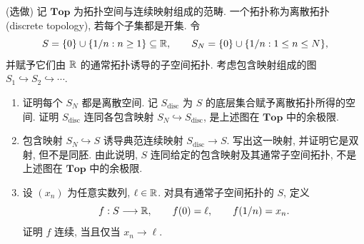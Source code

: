 \documentclass{article}
\begin{document}
\begin{problem}
({\heiti 选做}) 记 $\mathbf{Top}$ 为拓扑空间与连续映射组成的范畴. 一个拓扑称为离散拓扑 (discrete topology), 若每个子集都是开集. 令
\[
  S=\{0\}\cup\{1/n:n\ge1\}\subseteq\mathbb{R},\qquad S_N=\{0\}\cup\{1/n:1\le n\le N\},
\]
并赋予它们由 $\mathbb{R}$ 的通常拓扑诱导的子空间拓扑. 考虑包含映射组成的图 $S_1\hookrightarrow S_2\hookrightarrow\cdots$.
\begin{enumerate}
  \item[(a)] 证明每个 $S_N$ 都是离散空间. 记 $S_{\mathrm{disc}}$ 为 $S$ 的底层集合赋予离散拓扑所得的空间. 证明 $S_{\mathrm{disc}}$ 连同各包含映射 $S_N\hookrightarrow S_{\mathrm{disc}}$, 是上述图在 $\mathbf{Top}$ 中的余极限.
  \item[(b)] 包含映射 $S_N\hookrightarrow S$ 诱导典范连续映射 $S_{\mathrm{disc}}\to S$. 写出这一映射, 并证明它是双射, 但不是同胚. 由此说明, $S$ 连同给定的包含映射及其通常子空间拓扑, 不是上述图在 $\mathbf{Top}$ 中的余极限.
  \item[(c)] 设 $(x_n)$ 为任意实数列, $\ell\in\mathbb{R}$. 对具有通常子空间拓扑的 $S$, 定义
  \[
    f:S\longrightarrow\mathbb{R},\qquad f(0)=\ell,\qquad f(1/n)=x_n.
  \]
  证明 $f$ 连续, 当且仅当 $x_n\to\ell$.
\end{enumerate}
\end{problem}
\end{document}
